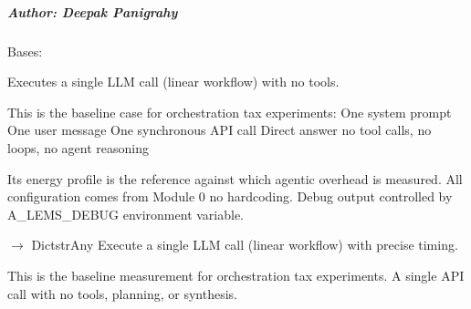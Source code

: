 \documentclass[letterpaper,10pt,english]{sphinxmanual}
\begin{document}
\subparagraph{Author: Deepak Panigrahy}
\label{\detokenize{core.execution.linear:author-deepak-panigrahy}}

\begin{fulllineitems}
\label{\detokenize{core.execution.linear:core.execution.linear.LinearExecutor}}
\pysigstartsignatures
\pysiglinewithargsret
{}
{}
{}
\pysigstopsignatures
\sphinxAtStartPar
Bases: 

\sphinxAtStartPar
Executes a single LLM call (linear workflow) with no tools.

\sphinxAtStartPar
This is the baseline case for orchestration tax experiments:
\sphinxhyphen{} One system prompt
\sphinxhyphen{} One user message
\sphinxhyphen{} One synchronous API call
\sphinxhyphen{} Direct answer \textendash{} no tool calls, no loops, no agent reasoning

\sphinxAtStartPar
Its energy profile is the reference against which agentic overhead is measured.
All configuration comes from Module 0 \textendash{} no hardcoding.
Debug output controlled by A\_LEMS\_DEBUG environment variable.

\begin{fulllineitems}
\label{\detokenize{core.execution.linear:core.execution.linear.LinearExecutor.execute}}
\pysigstartsignatures
\pysiglinewithargsret
{}
{\sphinxparamcomma {}}
{{ $\rightarrow$ Dict\DUrole{p}{{[}}strAny\DUrole{p}{{]}}}}
\pysigstopsignatures
\sphinxAtStartPar
Execute a single LLM call (linear workflow) with precise timing.
\begin{description}
\sphinxAtStartPar
This is the baseline measurement for orchestration tax experiments.
A single API call with no tools, planning, or synthesis.


\end{description}
\end{fulllineitems}
\end{fulllineitems}
\end{document}
